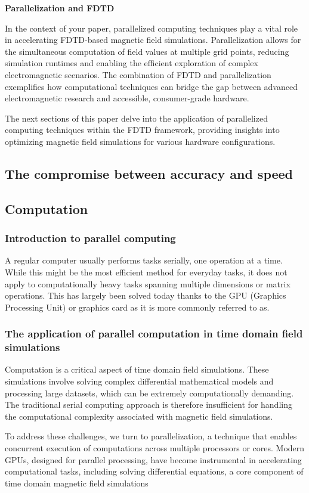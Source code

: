 \documentclass[11pt, a4paper, titlepage]{article}
\begin{document}
\textbf{Parallelization and FDTD}

In the context of your paper, parallelized computing techniques play a vital role in accelerating FDTD-based magnetic field simulations. Parallelization allows for the simultaneous computation of field values at multiple grid points, reducing simulation runtimes and enabling the efficient exploration of complex electromagnetic scenarios. The combination of FDTD and parallelization exemplifies how computational techniques can bridge the gap between advanced electromagnetic research and accessible, consumer-grade hardware.

The next sections of this paper delve into the application of parallelized computing techniques within the FDTD framework, providing insights into optimizing magnetic field simulations for various hardware configurations.
\newpage

\subsection{The compromise between accuracy and speed}
\newpage
\subsection{Computation}
\subsubsection{Introduction to parallel computing}
A regular computer usually performs tasks serially, one operation at a time. While this might be the most efficient method for everyday tasks, it does not apply to computationally heavy tasks spanning multiple dimensions or matrix operations. This has largely been solved today thanks to the GPU (Graphics Processing Unit) or graphics card as it is more commonly referred to as.
\subsubsection{The application of parallel computation in time domain field simulations}
Computation is a critical aspect of time domain field simulations. These simulations involve solving complex differential mathematical models and processing large datasets, which can be extremely computationally demanding. The traditional serial computing approach is therefore insufficient for handling the computational complexity associated with magnetic field simulations.

To address these challenges, we turn to parallelization, a technique that enables concurrent execution of computations across multiple processors or cores. Modern GPUs, designed for parallel processing, have become instrumental in accelerating computational tasks, including solving differential equations, a core component of time domain magnetic field simulations
\end{document}
